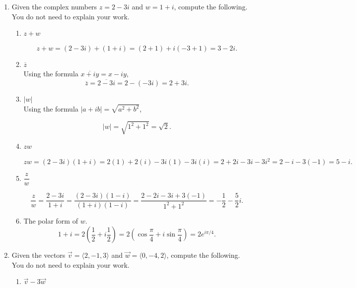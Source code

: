 \documentclass[12pt]{article}
\newcommand{\points}[1]{\marginpar{\hspace{24pt}[#1]}}
\newcommand{\abs}[1]{\lvert #1\rvert}
\begin{document}
\begin{enumerate}
\item Given the complex numbers $z=2-3i$ and $w=1+i$, compute the following. You do not need to explain your work.
 \begin{enumerate}
\item $z+w$ \points{2}

\[
 z+w=(2-3i)+(1+i)=(2+1)+i(-3+1)=3-2i.
\]

\bigskip

\item $\overline{z}$ \points{2}\\

Using the formula $\overline{x+iy}=x-iy$,
\[
 \overline{z} = \overline{2-3i} = 2-(-3i) = 2+3i.
\]


\bigskip

\item $\abs{w}$ \points{2}\\

Using the formula $\abs{a+ib} = \sqrt{a^2+b^2}$,

\[
 \abs{w} = \sqrt{1^2+1^2} = \sqrt{2}.
\]


\bigskip

\item $zw$ \points{2}

\[
 zw=(2-3i)(1+i) = 2(1)+2(i)-3i(1)-3i(i) = 2+2i-3i-3i^2=2-i-3(-1)=5-i.
\]


\bigskip

\item $\dfrac{z}{w}$ \points{3}

\[
 \frac{z}{w}=\frac{2-3i}{1+i} = \frac{(2-3i)(1-i)}{(1+i)(1-i)} = \frac{2-2i-3i+3(-1)}{1^2+1^2} = -\frac{1}{2}-\frac{5}{2}i.
\]


\bigskip

\item The polar form of $w$. \points{3}\\

\[
1+i = 2\left(\frac{1}{2}+i\frac{1}{2}\right) =2\left(\cos \frac{\pi}{4} + i\sin\frac{\pi}{4}\right) = 2e^{i\pi/4}.
\]

\end{enumerate}

\newpage

\item Given the vectors $\vec{v} = \langle 2, -1, 3\rangle$ and $\vec{w} = \langle 0, -4, 2\rangle$, compute the following. You do not need to explain your work.
\begin{enumerate}
 \item $\vec{v}-3\vec{w}$  \points{2}


\end{enumerate}
\end{enumerate}
\end{document}
